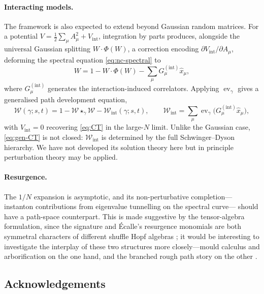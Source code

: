 \documentclass[11pt,a4paper]{article}
\DeclareMathOperator{\ev}{ev}
\newcommand{\xh}{\hat{x}}
\newcommand{\cW}{\mathcal{W}}
\begin{document}
\paragraph{Interacting models.}\label{sec:interact}
The framework is also expected to extend beyond Gaussian random matrices. For a potential $V=\frac{1}{2}\sum_\mu A_\mu^2+V_{\mathrm{int}}$, integration by parts produces, alongside the universal Gaussian splitting $W\cdot\Phi(W)$, a correction encoding $\partial V_{\mathrm{int}}/\partial A_\mu$, deforming the spectral equation \eqref{eq:nc-spectral} to
\begin{equation}\label{eq:nc-int}
  W = 1 - W\cdot\Phi(W) - \sum_\mu G_\mu^{(\mathrm{int})}\xh_\mu,
\end{equation}
where $G_\mu^{(\mathrm{int})}$ generates the interaction-induced correlators. Applying $\ev_\gamma$ gives a generalised path development equation,
\begin{equation}\label{eq:gen-CT}
  \cW(\gamma;s,t) = 1 - \cW\star_\gamma\cW - \cW_{\mathrm{int}}(\gamma;s,t), \qquad \cW_{\mathrm{int}} = \sum_\mu\ev_\gamma\bigl(G_\mu^{(\mathrm{int})}\xh_\mu\bigr),
\end{equation}
with $V_{\mathrm{int}}=0$ recovering \eqref{eq:CT} in the large-$N$ limit. Unlike the Gaussian case, \eqref{eq:gen-CT} is not closed: $\cW_{\mathrm{int}}$ is determined by the full Schwinger--Dyson hierarchy. We have not developed its solution theory here but in principle perturbation theory may be applied.

\paragraph{Resurgence.}
The $1/N$ expansion is asymptotic, and its non-perturbative completion--- instanton contributions from eigenvalue tunnelling on the spectral curve--- should have a path-space counterpart. This is made suggestive by the tensor-algebra formulation, since the signature and \'{E}calle's resurgence monomials are both symmetral characters of different shuffle Hopf algebras \cite{fauvet2017ecalle}; it would be interesting to investigate the interplay of these two structures more closely---mould calculus and arborification on the one hand, and the branched rough path story on the other \cite{curry2020planarly}.







\subsection*{Acknowledgements}
\end{document}

